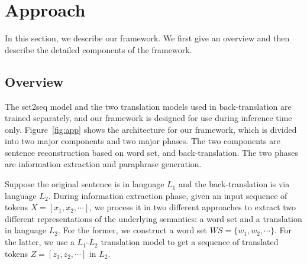 \section{Approach}
In this section, we describe our framework. We first give an overview and
then describe the detailed components of the framework.

\subsection{Overview} \label{sec:overview}


The set2seq model and the two translation models used in back-translation 
are trained separately, and our framework is designed for use during
inference time only. Figure~\ref{fig:app} shows the architecture for 
our framework, which is divided into two major components and two major phases. The two components are sentence reconstruction based on word set, 
and back-translation. The two phases are 
information extraction and paraphrase generation.


Suppose the original sentence is in language $L_1$ and the back-translation 
is via language $L_2$. During information extraction phase, given an input 
sequence of tokens $X = [x_1, x_2, \cdots]$, we process it in two different 
approaches to extract two different representations of the underlying semantics: a word set and a translation in language $L_2$. For the former, we 
construct a word set $WS = \{w_1, w_2,\cdots\}$. For the latter, we use a $L_1$-$L_2$ translation model to get a sequence of translated tokens 
$Z = [z_1, z_2, \cdots]$ in $L_2$. 

